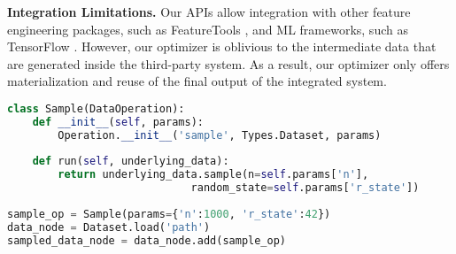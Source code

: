\textbf{Integration Limitations.}
Our APIs allow integration with other feature engineering packages, such as FeatureTools \cite{kanter2015deep}, and ML frameworks, such as TensorFlow \cite{abadi2016tensorflow}.
However, our optimizer is oblivious to the intermediate data that are generated inside the third-party system.
As a result, our optimizer only offers materialization and reuse of the final output of the integrated system. 
\begin{lstlisting}[language=Python, caption=Defining and using a new operation,captionpos=b,label = {adding-new-operations}]
class Sample(DataOperation):
    def __init__(self, params):
        Operation.__init__('sample', Types.Dataset, params)
        
    def run(self, underlying_data):
        return underlying_data.sample(n=self.params['n'],
                             random_state=self.params['r_state'])
                    
sample_op = Sample(params={'n':1000, 'r_state':42}) 
data_node = Dataset.load('path')
sampled_data_node = data_node.add(sample_op)
\end{lstlisting}